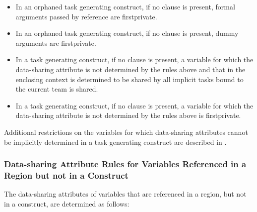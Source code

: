 \begin{cppspecific}
\begin{itemize}
\item In an orphaned task generating
construct, if no  clause is present, formal arguments passed by reference are firstprivate.
\end{itemize}
\end{cppspecific}
%
\begin{fortranspecific}
\begin{itemize}
\item In an orphaned task generating
construct, if no  clause is present, dummy arguments
are firstprivate.
\end{itemize}
\end{fortranspecific}
%
\begin{itemize}
\item In a task generating construct, if no  clause is present, a variable
for which the data-sharing attribute is not determined by the rules above
and that in the enclosing context is determined to be shared by all implicit tasks bound
to the current team is shared.

\item In a task generating construct, if no
 clause is present, a variable for which the data-sharing
attribute is not determined by the rules above is firstprivate.
\end{itemize}

Additional restrictions on the variables for which data-sharing attributes cannot be
implicitly determined in a task generating construct are described in
.









\subsubsection{Data-sharing Attribute Rules for Variables Referenced in a Region but not in a Construct}
\label{subsubsec:Data-sharing Attribute Rules for Variables Referenced in a Region but not in a Construct}
The data-sharing attributes of variables that are referenced in a region, but not in a
construct, are determined as follows:


